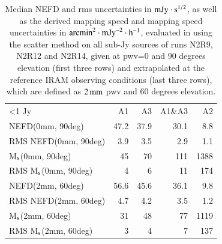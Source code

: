 \begin{table}[!thbp]
  \begin{center}
    \caption[NEFD estimates on all sub-Jy sources]{Median NEFD and rms
      uncertainties in $\rm{mJy}\cdot \rm{s}^{1/2}$, as well as the derived mapping
      speed and mapping speed uncertainties in $\rm{arcmin}^2\cdot\rm{mJy}^{-2}\cdot\rm{h}^{-1}$, evaluated
      in using the scatter method on all sub-Jy sources of runs N2R9, N2R12
      and N2R14, given at pwv=0 and 90 degrees elevation (first three rows) and extrapolated at the
      reference IRAM observing conditions (last three rows), which are defined
      as $2\,\rm{mm}$ pwv and 60 degrees elevation.}
    \label{tab:nefd_astro}
    \begin{tabular}{lrrrr}
      \hline\hline
      \noalign{\smallskip}
      <1 Jy               & A1      &   A3    &   A1\&A3 &    A2 \\
      \noalign{\smallskip}
      \hline
      \noalign{\smallskip}
      NEFD\small{(0mm, 90deg)}             & 47.2    & 37.9    &    30.1  &    8.8   \\
      RMS NEFD\small{(0mm, 90deg)}         &  3.9    &  3.5    &     2.9  &    1.1   \\
      M$_{\rm{s}}$\small{(0mm, 90deg)}      & 45      &  70     &    111   &   1388   \\
      RMS M$_{\rm{s}}$\small{(0mm, 90deg)}  &  4      &   6     &     11   &    174   \\
      \hline
      \noalign{\smallskip}
      NEFD\small{(2mm, 60deg)}             & 56.6    & 45.6    &    36.1  &    9.8   \\
      RMS NEFD\small{(2mm, 60deg)}         &  4.7    & 4.2     &     3.5  &    1.2   \\
      M$_{\rm{s}}$\small{(2mm, 60deg)}      &  31    & 48       &    77   &   1119   \\
      RMS M$_{\rm{s}}$\small{(2mm, 60deg)}  &   3    &  4       &     7     &  137   \\
      \hline
    \end{tabular}
\end{center}
\end{table}
